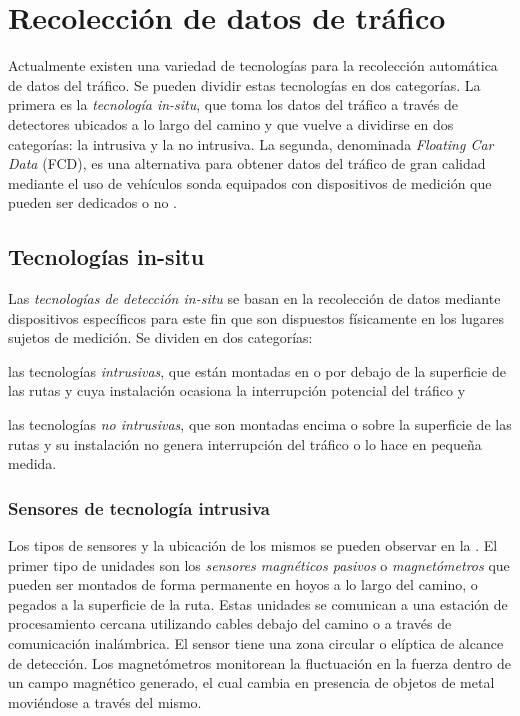 \chapter{Recolección de datos de tráfico}
\label{cap:3}

Actualmente existen una variedad de tecnologías para la recolección automática de datos del tráfico. Se  pueden dividir estas tecnologías en dos categorías. La primera es la \emph{tecnología in-situ}, que toma los datos del tráfico a través de detectores ubicados a lo largo del camino y que vuelve a dividirse en dos categorías: la intrusiva y la no intrusiva. La segunda, denominada \emph{Floating Car Data} (FCD), es una alternativa para obtener datos del tráfico de gran calidad mediante el uso de vehículos sonda equipados con dispositivos de medición que pueden ser dedicados o no \citep{mimbela2003summary}.

\section{Tecnologías in-situ}

Las \emph{tecnologías de detección in-situ} se basan en la recolección de datos mediante dispositivos específicos para este fin que son dispuestos físicamente en los lugares sujetos de medición. Se dividen en dos categorías: \begin{enumerate*}[a)] \item las tecnologías \emph{intrusivas}, que están montadas en o por debajo de la superficie de las rutas y cuya instalación ocasiona la interrupción potencial del tráfico y \item las tecnologías \emph{no intrusivas}, que son montadas encima o sobre la superficie de las rutas y su instalación no genera interrupción del tráfico o lo hace en pequeña medida.\end{enumerate*}

\subsection{Sensores de tecnología intrusiva}

Los tipos de sensores y la ubicación de los mismos se pueden observar en la . El primer tipo de unidades son los \emph{sensores magnéticos pasivos} o  \emph{magnetómetros} que pueden ser montados de forma permanente en hoyos a lo largo del camino, o pegados a la superficie de la ruta. Estas unidades se comunican a una estación de procesamiento cercana utilizando cables debajo del camino o a través de comunicación inalámbrica. El sensor tiene una zona circular o elíptica de alcance de detección. Los magnetómetros monitorean la fluctuación en la fuerza dentro de un campo magnético generado, el cual cambia en presencia de objetos de metal moviéndose a través del mismo.

